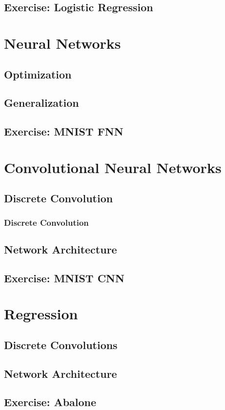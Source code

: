 \documentclass[aspectratio=169]{beamer}
\newcommand\imageright[1]{ %
    \caption*{\scalebox{.5}{\textcolor{lightgray}{\textcopyright~#1}}} %
}
\begin{document}
\subsection{Exercise: Logistic Regression}

\section{Neural Networks}

\subsection{Optimization}
\subsection{Generalization}
\subsection{Exercise: MNIST FNN}

\section{Convolutional Neural Networks}

\subsection{Discrete Convolution}
\label{subsec:discrete-convolution}

\begin{frame}
    \frametitle{Discrete Convolution}
    \begin{figure}
        \centering
        \imageright{Machine Learning Guru}
    \end{figure}
\end{frame}

\subsection{Network Architecture}
\subsection{Exercise: MNIST CNN}

\section{Regression}

\subsection{Discrete Convolutions}
\subsection{Network Architecture}
\subsection{Exercise: Abalone}
\end{document}
